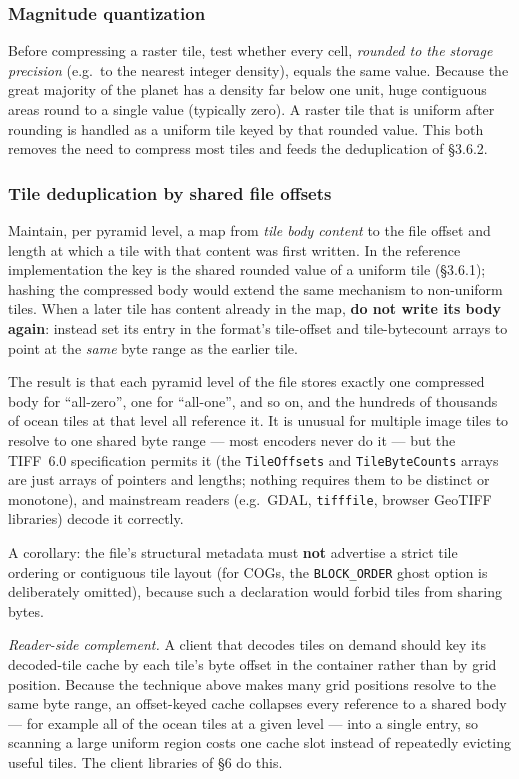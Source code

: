 \documentclass[10pt,twocolumn]{article}
\newcommand{\code}[1]{\texttt{#1}}
\begin{document}
\subsubsection{Magnitude quantization}

Before compressing a raster tile, test whether every cell, \emph{rounded to the
storage precision} (e.g.\ to the nearest integer density), equals the same
value. Because the great majority of the planet has a density far below one
unit, huge contiguous areas round to a single value (typically zero). A raster
tile that is uniform after rounding is handled as a uniform tile keyed by that
rounded value. This both removes the need to compress most tiles and feeds the
deduplication of \S3.6.2.

\subsubsection{Tile deduplication by shared file offsets}

Maintain, per pyramid level, a map from \emph{tile body content} to the file
offset and length at which a tile with that content was first written. In the
reference implementation the key is the shared rounded value of a uniform tile
(\S3.6.1); hashing the compressed body would extend the same mechanism to
non-uniform tiles. When a later tile has content already in the map,
\textbf{do not write its body again}: instead set its entry in the format's
tile-offset and tile-bytecount arrays to point at the \emph{same} byte range as
the earlier tile.

The result is that each pyramid level of the file stores exactly one
compressed body for \enquote{all-zero}, one for \enquote{all-one}, and so on,
and the hundreds of thousands of ocean tiles at that level all reference it.
It is unusual for multiple image tiles to resolve to one shared byte range ---
most encoders never do it --- but the TIFF~6.0 specification permits it (the
\code{TileOffsets} and \code{TileByteCounts} arrays are just arrays of pointers
and lengths; nothing requires them to be distinct or monotone), and mainstream
readers (e.g.\ GDAL, \code{tifffile}, browser GeoTIFF libraries) decode it
correctly.

A corollary: the file's structural metadata must \textbf{not} advertise a
strict tile ordering or contiguous tile layout (for COGs, the \code{BLOCK\_ORDER}
ghost option is deliberately omitted), because such a declaration would forbid
tiles from sharing bytes.

\emph{Reader-side complement.} A client that decodes tiles on demand should key
its decoded-tile cache by each tile's byte offset in the container rather than
by grid position. Because the technique above makes many grid positions resolve
to the same byte range, an offset-keyed cache collapses every reference to a
shared body --- for example all of the ocean tiles at a given level --- into a
single entry, so scanning a large uniform region costs one cache slot instead
of repeatedly evicting useful tiles. The client libraries of \S6 do this.
\end{document}
